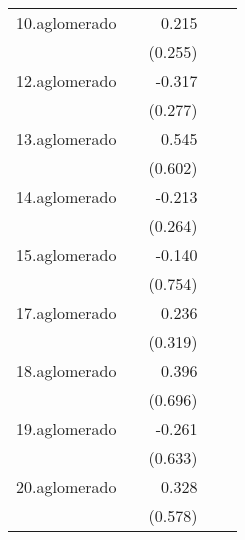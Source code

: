 {\begin{longtable}{l*{4}{D{.}{.}{-1}}}
\addlinespace
10.aglomerado&                     &       0.215         &                     &                     \\
            &                     &     (0.255)         &                     &                     \\
\addlinespace
12.aglomerado&                     &      -0.317         &                     &                     \\
            &                     &     (0.277)         &                     &                     \\
\addlinespace
13.aglomerado&                     &       0.545         &                     &                     \\
            &                     &     (0.602)         &                     &                     \\
\addlinespace
14.aglomerado&                     &      -0.213         &                     &                     \\
            &                     &     (0.264)         &                     &                     \\
\addlinespace
15.aglomerado&                     &      -0.140         &                     &                     \\
            &                     &     (0.754)         &                     &                     \\
\addlinespace
17.aglomerado&                     &       0.236         &                     &                     \\
            &                     &     (0.319)         &                     &                     \\
\addlinespace
18.aglomerado&                     &       0.396         &                     &                     \\
            &                     &     (0.696)         &                     &                     \\
\addlinespace
19.aglomerado&                     &      -0.261         &                     &                     \\
            &                     &     (0.633)         &                     &                     \\
\addlinespace
20.aglomerado&                     &       0.328         &                     &                     \\
            &                     &     (0.578)         &                     &                     \\

\end{longtable}}
